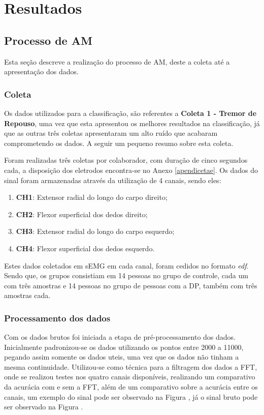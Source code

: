 \chapter{Resultados}
\label{ch:Resultados}

\section{Processo de AM}
Esta seção descreve a realização do processo de AM, deste a coleta até a apresentação dos dados.
\subsection{Coleta}
Os dados utilizados para a classificação, são referentes a \textbf{Coleta 1 - Tremor de Repouso}, uma vez que esta apresentou os melhores resultados na classificação, já que as outras três coletas apresentaram um alto ruído que acabaram comprometendo os dados. A seguir um pequeno resumo sobre esta coleta.

Foram realizadas três coletas por colaborador, com duração de cinco segundos cada, a disposição dos eletrodos encontra-se no Anexo \ref{apendicetae}. Os dados do sinal foram armazenadas através da utilização de 4 canais, sendo eles:

\begin{enumerate}
    \item \textbf{CH1}: Extensor radial do longo do carpo direito;
    \item \textbf{CH2}: Flexor superficial dos dedos direito;
    \item \textbf{CH3}: Extensor radial do longo do carpo esquerdo;
    \item \textbf{CH4}: Flexor superficial dos dedos esquerdo.
\end{enumerate}

Estes dados coletados em sEMG em cada canal, foram cedidos no formato \textit{edf}. Sendo que, os grupos consistiam em 14 pessoas no grupo de controle, cada um com três amostras e 14 pessoas no grupo de pessoas com a DP, também com três amostras cada.

\subsection{Processamento dos dados}
Com os dados brutos foi iniciada a etapa de pré-processamento dos dados. Inicialmente padronizou-se os dados utilizando os pontos entre 2000 a 11000, pegando assim somente os dados uteis, uma vez que os dados não tinham a mesma continuidade. Utilizou-se como técnica para a filtragem dos dados a FFT, onde se realizou testes nos quatro canais disponíveis, realizando um comparativo da acurácia com e sem a FFT, além de um comparativo sobre a acurácia entre os canais, um exemplo do sinal pode ser observado na Figura \cite{fftimage}, já o sinal bruto pode ser observado na Figura \cite{sinalbruto}.

